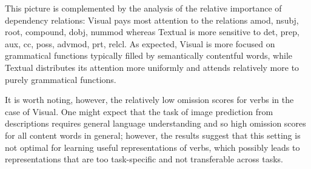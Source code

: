 This picture is complemented by the analysis of the
relative importance of dependency relations: {\sc Visual} pays most
attention to the relations {\sc amod, nsubj, root,
  compound, dobj, nummod}
whereas {\sc Textual} is more sensitive to {\sc det, prep, aux, cc, poss, advmod, prt, relcl}.
As expected, {\sc Visual} is more focused on grammatical
functions typically filled by semantically contentful words, while
{\sc Textual} distributes its attention more uniformly and
attends relatively more to purely grammatical functions.

It is worth noting, however, the relatively low omission scores for verbs in the case
of {\sc Visual}. One might expect that the task of image prediction from
descriptions requires general language understanding and so high omission
scores for all content words in general; however, the results
suggest that this setting is not optimal for learning useful representations of verbs,
which possibly leads to representations that are too task-specific
and not transferable across tasks.

